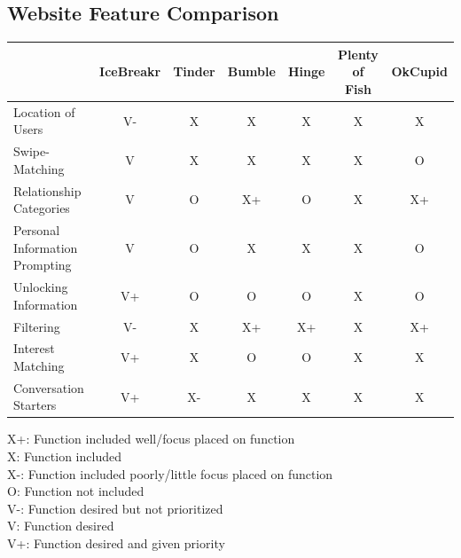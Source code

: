 \documentclass{article}
\begin{document}
    \subsection{Website Feature Comparison}
    \hspace{-2cm}\begin{tabular}{|l|c|c|c|c|c|c|}
        \hline
         & IceBreakr & Tinder & Bumble & Hinge & Plenty of Fish & OkCupid \\
         \hline
         Location of Users & V- & X & X & X & X & X \\
         \hline
         Swipe-Matching & V & X & X & X & X & O \\
         \hline
         Relationship Categories & V & O & X+ & O & X & X+ \\
         \hline
         Personal Information Prompting & V & O & X & X & X & O \\
         \hline
         Unlocking Information & V+ & O & O & O & X & O \\
         \hline
         Filtering & V- & X & X+ & X+ & X & X+ \\
         \hline
         Interest Matching & V+ & X & O & O & X & X \\
         \hline
         Conversation Starters & V+ & X- & X & X & X & X \\
         \hline
    \end{tabular}
    X+: Function included well/focus placed on function\\
    X: Function included\\
    X-: Function included poorly/little focus placed on function\\
    O: Function not included\\
    V-: Function desired but not prioritized\\
    V: Function desired\\
    V+: Function desired and given priority\\
\end{document}
